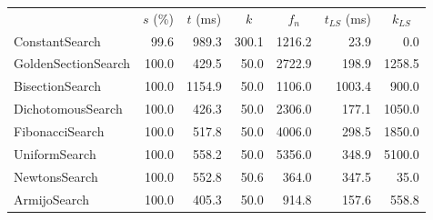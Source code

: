 \documentclass[a4paper,english,titlepage,12pt]{article}
\begin{document}
\begin{center}
\label{tab:performance_results_MatrixSquareSum}
\begin{tabular}{|l|r|r|r|r|r|r|}
\hline
\rowcolor{gray!25}
\multicolumn{1}{|c|}{Line Search Name} & \multicolumn{1}{c|}{$s$ (\%)} & \multicolumn{1}{c|}{$t$ (ms)} & \multicolumn{1}{c|}{$k$} & \multicolumn{1}{c|}{$f_n$} & \multicolumn{1}{c|}{$t_{LS}$ (ms)} & \multicolumn{1}{c|}{$k_{LS}$} \\
ConstantSearch & 99.6 & 989.3 & 300.1 & 1216.2 & 23.9 & 0.0 \\
GoldenSectionSearch & 100.0 & 429.5 & 50.0 & 2722.9 & 198.9 & 1258.5 \\
BisectionSearch & 100.0 & 1154.9 & 50.0 & 1106.0 & 1003.4 & 900.0 \\
DichotomousSearch & 100.0 & 426.3 & 50.0 & 2306.0 & 177.1 & 1050.0 \\
FibonacciSearch & 100.0 & 517.8 & 50.0 & 4006.0 & 298.5 & 1850.0 \\
UniformSearch & 100.0 & 558.2 & 50.0 & 5356.0 & 348.9 & 5100.0 \\
NewtonsSearch & 100.0 & 552.8 & 50.6 & 364.0 & 347.5 & 35.0 \\
ArmijoSearch & 100.0 & 405.3 & 50.0 & 914.8 & 157.6 & 558.8 \\

\hline
\end{tabular}
\end{center}
\end{document}

